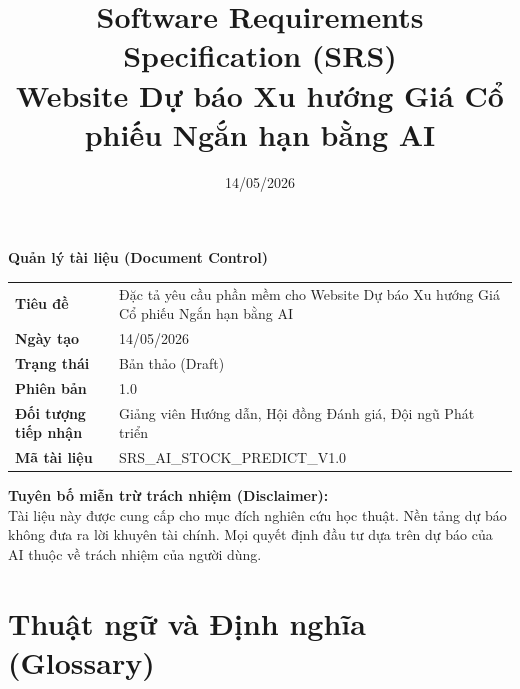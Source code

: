 \documentclass[12pt, a4paper]{article}
\title{\textbf{Software Requirements Specification (SRS)}\\ Website Dự báo Xu hướng Giá Cổ phiếu Ngắn hạn bằng AI}
\author{}
\date{14/05/2026}
\begin{document}
\maketitle
\thispagestyle{empty}

\noindent\textbf{Quản lý tài liệu (Document Control)}

\begin{table}[htbp]
    \centering
    \renewcommand{\arraystretch}{1.5}
    \begin{tabularx}{\textwidth}{|l|X|}
        \hline
        \rowcolor{cyan!15}
        \multicolumn{2}{|l|}{\textbf{Thông tin tài liệu}}                                                                \\
        \hline
        \textbf{Tiêu đề}             & Đặc tả yêu cầu phần mềm cho Website Dự báo Xu hướng Giá Cổ phiếu Ngắn hạn bằng AI \\
        \hline
        \textbf{Ngày tạo}            & 14/05/2026                                                                        \\
        \hline
        \textbf{Trạng thái}          & Bản thảo (Draft)                                                                  \\
        \hline
        \textbf{Phiên bản}           & 1.0                                                                               \\
        \hline
        \textbf{Đối tượng tiếp nhận} & Giảng viên Hướng dẫn, Hội đồng Đánh giá, Đội ngũ Phát triển                       \\
        \hline
        \textbf{Mã tài liệu}         & SRS\_AI\_STOCK\_PREDICT\_V1.0                                                     \\
        \hline
    \end{tabularx}
\end{table}

\noindent\textbf{Tuyên bố miễn trừ trách nhiệm (Disclaimer):}\\
Tài liệu này được cung cấp cho mục đích nghiên cứu học thuật. Nền tảng dự báo không đưa ra lời khuyên tài chính. Mọi quyết định đầu tư dựa trên dự báo của AI thuộc về trách nhiệm của người dùng.

\newpage
\tableofcontents
\newpage

\section*{Thuật ngữ và Định nghĩa (Glossary)}
\end{document}
